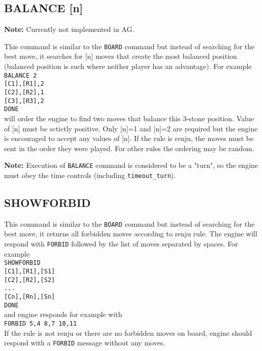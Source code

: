 \documentclass[12pt,a4paper]{article}
\begin{document}
\subsection{BALANCE [n]}
\label{cmd_balance}
\textbf{Note:} Currently not implemented in AG.

This command is similar to the \texttt{BOARD} command but instead of searching for the best move, it searches for [n] moves that create the most balanced position (balanced position is such where neither player has an advantage). For example\\
\texttt{BALANCE 2} \\
\texttt{[C1],[R1],2} \\
\texttt{[C2],[R2],1} \\
\texttt{[C3],[R3],2} \\
\texttt{DONE}\\
will order the engine to find two moves that balance this 3-stone position. Value of [n] must be sctictly positive. Only [n]=1 and [n]=2 are required but the engine is encouraged to accept any values of [n]. If the rule is renju, the moves must be sent in the order they were played. For other rules the ordering may be random.

\textbf{Note:} Execution of \texttt{BALANCE} command is considered to be a "turn", so the engine must obey the time controls (including \texttt{timeout{\_}turn}).


\subsection{SHOWFORBID}
\label{cmd_showforbid}
This command is similar to the \texttt{BOARD} command but instead of searching for the best move, it returns all forbidden moves according to renju rule. The engine will respond with \texttt{FORBID} followed by the list of moves separated by spaces. For example\\
\texttt{SHOWFORBID}\\
\texttt{[C1],[R1],[S1]} \\
\texttt{[C2],[R2],[S2]} \\
\texttt{...}\\
\texttt{[Cn],[Rn],[Sn]} \\
\texttt{DONE}\\
and engine responds for example with\\
\texttt{FORBID 5,4 8,7 10,11}\\
If the rule is not renju or there are no forbidden moves on board, engine should respond with a \texttt{FORBID} message without any moves.
\end{document}
